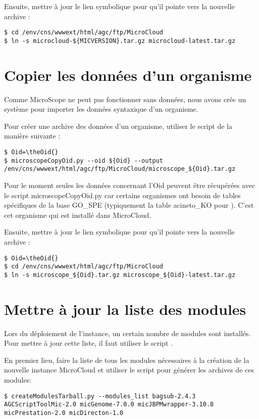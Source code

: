 Ensuite, mettre à jour le lien symbolique pour qu'il pointe vers la nouvelle archive :
\begin{lstlisting}[style=bash]
$ cd /env/cns/wwwext/html/agc/ftp/MicroCloud
$ ln -s microcloud-${MICVERSION}.tar.gz microcloud-latest.tar.gz
\end{lstlisting}

\section{Copier les données d'un organisme} \label{sec:nouvelle_donne_organisme}

Comme MicroScope ne peut pas fonctionner sans données, nous avons crée un système
pour importer les données syntaxique d'un organisme.

Pour créer une archive des données d'un organisme, utiliser le script  de la manière suivante :
\begin{lstlisting}[style=bash]
$ Oid=\theOid{}
$ microscopeCopyOid.py --oid ${Oid} --output /env/cns/wwwext/html/agc/ftp/MicroCloud/microscope_${Oid}.tar.gz
\end{lstlisting}

\begin{mycolorbox}
    Pour le moment seules les données concernant l'Oid \theOid{} peuvent être récupérées avec le script microscopeCopyOid.py car certains organismes ont besoin de tables spécifiques de la base GO\_SPE (typiquement la table acineto\_KO pour \theOrg{}).
    C'est cet organisme qui est installé dans MicroCloud.
\end{mycolorbox}

Ensuite, mettre à jour le lien symbolique pour qu'il pointe vers la nouvelle archive :
\begin{lstlisting}[style=bash]
$ Oid=\theOid{}
$ cd /env/cns/wwwext/html/agc/ftp/MicroCloud
$ ln -s microscope_${Oid}.tar.gz microscope_${Oid}-latest.tar.gz
\end{lstlisting}

\section{Mettre à jour la liste des modules} \label{sec:nouvelle_liste_modules}

Lors du déploiement de l'instance, un certain nombre de modules sont installés.
Pour mettre à jour cette liste, il faut utiliser le script .

En premier lieu, faire la liste de tous les modules nécessaires à la création de la nouvelle instance MicroCloud et utiliser
le script  pour générer les archives de ces modules:
\begin{lstlisting}[style=bash]
$ createModulesTarball.py --modules_list bagsub-2.4.3 AGCScriptToolMic-2.0 micGenome-7.0.0 micJBPMwrapper-3.10.8 micPrestation-2.0 micDirecton-1.0
\end{lstlisting}

